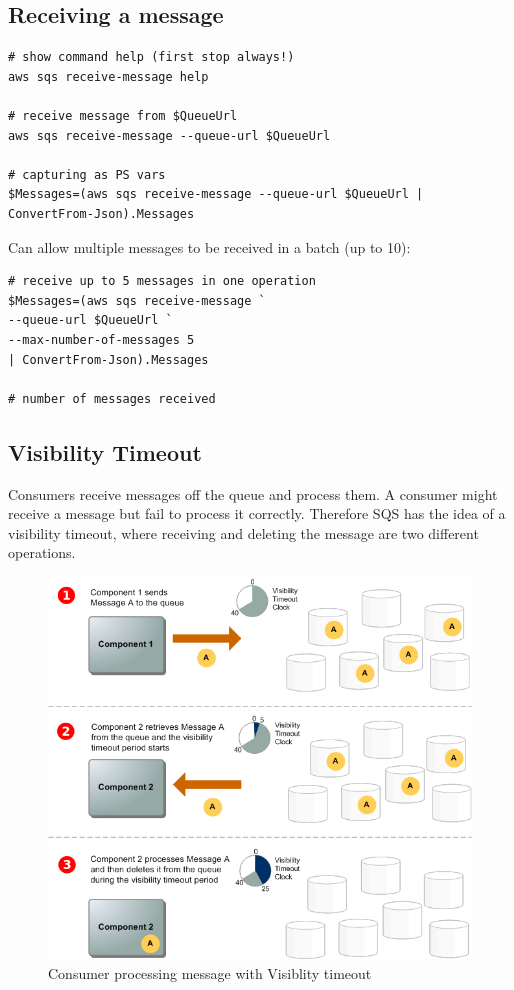 \documentclass{pgnotes}
\begin{document}
\subsection{Receiving a message}

\begin{verbatim}
# show command help (first stop always!)
aws sqs receive-message help

# receive message from $QueueUrl
aws sqs receive-message --queue-url $QueueUrl 

# capturing as PS vars
$Messages=(aws sqs receive-message --queue-url $QueueUrl | ConvertFrom-Json).Messages
\end{verbatim}

Can allow multiple messages to be received in a batch (up to 10):
\begin{verbatim}
# receive up to 5 messages in one operation
$Messages=(aws sqs receive-message `
--queue-url $QueueUrl `
--max-number-of-messages 5 
| ConvertFrom-Json).Messages

# number of messages received
\end{verbatim}

\subsection{Visibility Timeout}

Consumers receive messages off the queue and process them.
A consumer might receive a message but fail to process it correctly.
Therefore SQS has the idea of a visibility timeout, where receiving and deleting the message are two different operations.

\begin{figure}[htbp]
  \centering
  \includegraphics{sqs_message_lifecycle}
  \caption{Consumer processing message with Visiblity timeout}
  \label{fig:visibility-timeout-processing}
\end{figure}
\end{document}
